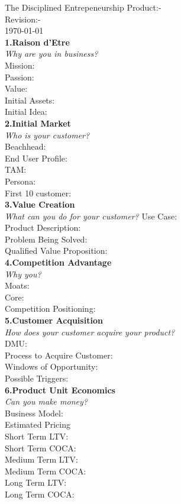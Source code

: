 \documentclass[a4paper]{article}
\begin{document}
\LARGE{The Disciplined Entrepeneurship}
\Large{Product:-}\\
\Large{Revision:-}\\
\Large{\today}\\

\textbf{1.Raison d'Etre}\\
\textit{Why are you in business?}\\
Mission:\\
Passion:\\
Value:\\
Initial Assets:\\
Initial Idea:\\

\textbf{2.Initial Market}\\
\textit{Who is your customer?}\\
Beachhead:\\
End User Profile:\\
TAM:\\
Persona:\\
First 10 customer:\\

\textbf{3.Value Creation}\\
\textit{What can you do for your customer?}
Use Case:\\
Product Description:\\
Problem Being Solved:\\
Qualified Value Proposition:\\

\textbf{4.Competition Advantage}\\
\textit{Why you?}\\
Moats:\\
Core:\\
Competition Positioning:\\

\textbf{5.Customer Acquisition}\\
\textit{How does your customer acquire your product?}\\
DMU:\\
Process to Acquire Customer:\\
Windows of Opportunity:\\
Possible Triggers:\\

\textbf{6.Product Unit Economics}\\
\textit{Can you make money?}\\
Business Model:\\
Estimated Pricing\\
Short Term LTV:\\
Short Term COCA:\\
Medium Term LTV:\\
Medium Term COCA:\\
Long Term LTV:\\
Long Term COCA:\\
\end{document}
